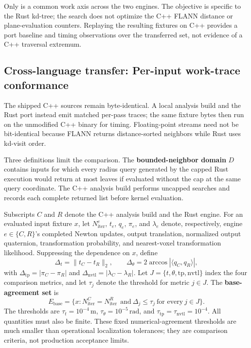 Only \sumnbr{} is a common work axis across the two engines. The \kdnodes{} objective is
specific to the Rust kd-tree; the search does not optimize the C++ FLANN distance or
plane-evaluation counters. Replaying the resulting fixtures on C++ provides a port baseline
and timing observations over the transferred set, not evidence of a C++ traversal extremum.

\subsection{Cross-language transfer: Per-input work-trace conformance}
\label{sec:meth-transfer}
The shipped C++ sources remain byte-identical. A local analysis build and the Rust port
instead emit matched per-pass traces; the same fixture bytes then run on the unmodified C++
binary for timing. Floating-point streams need not be bit-identical because FLANN returns
distance-sorted neighbors while Rust uses kd-visit order.

Three definitions limit the comparison. The \textbf{bounded-neighbor domain} $D$ contains
inputs for which every radius query generated by the capped Rust execution would return at
most \maxnn{} leaves if evaluated without the cap at the same query coordinate. The C++
analysis build performs uncapped searches and records each complete returned list before
kernel evaluation.

Subscripts $C$ and $R$ denote the C++ analysis build and the Rust engine. For an evaluated
input fixture $x$, let $N_{\mathrm{iter}}^e$, $t_e$, $q_e$, $\pi_e$, and $\lambda_e$
denote, respectively, engine $e\in\{C,R\}$'s completed Newton updates, output
translation, normalized output quaternion, transformation probability, and nearest-voxel
transformation likelihood. Suppressing the dependence on $x$, define
\[
 \Delta_t=\lVert t_C-t_R\rVert_2,\qquad
 \Delta_\theta=2\arccos |\langle q_C,q_R\rangle|,
\]
with $\Delta_{\mathrm{tp}}=|\pi_C-\pi_R|$ and
$\Delta_{\mathrm{nvtl}}=|\lambda_C-\lambda_R|$. Let
$J=\{t,\theta,\mathrm{tp},\mathrm{nvtl}\}$ index the four comparison metrics, and let
$\tau_j$ denote the threshold for metric $j\in J$. The \textbf{base-agreement set} is
\[
 E_{\mathrm{base}}=\{x:N_{\mathrm{iter}}^C=N_{\mathrm{iter}}^R\
 \ \text{and}\ \Delta_j\le\tau_j\ \text{for every}\ j\in J\}.
\]
The thresholds are
$\tau_t=10^{-4}\,\mathrm{m}$, $\tau_\theta=10^{-5}\,\mathrm{rad}$, and
$\tau_{\mathrm{tp}}=\tau_{\mathrm{nvtl}}=10^{-4}$.
All quantities must also be finite. These fixed numerical-agreement thresholds are much
smaller than operational localization tolerances; they are comparison criteria, not
production acceptance limits.

